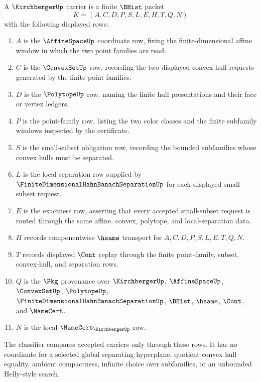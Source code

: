 \begin{definition}
\label{def:kirchberger-finite-separation-carrier}
A $\KirchbergerUp$ carrier is a finite $\BHist$ packet
$$
K=(A,C,D,P,S,L,E,H,T,Q,N)
$$
with the following displayed rows:
\begin{enumerate}
\item $A$ is the $\AffineSpaceUp$ coordinate row, fixing the finite-dimensional affine window in which the two point families are read.
\item $C$ is the $\ConvexSetUp$ row, recording the two displayed convex hull requests generated by the finite point families.
\item $D$ is the $\PolytopeUp$ row, naming the finite hull presentations and their face or vertex ledgers.
\item $P$ is the point-family row, listing the two color classes and the finite subfamily windows inspected by the certificate.
\item $S$ is the small-subset obligation row, recording the bounded subfamilies whose convex hulls must be separated.
\item $L$ is the local separation row supplied by $\FiniteDimensionalHahnBanachSeparationUp$ for each displayed small-subset request.
\item $E$ is the exactness row, asserting that every accepted small-subset request is routed through the same affine, convex, polytope, and local-separation data.
\item $H$ records componentwise $\hsame$ transport for $A,C,D,P,S,L,E,T,Q,N$.
\item $T$ records displayed $\Cont$ replay through the finite point-family, subset, convex-hull, and separation rows.
\item $Q$ is the $\Pkg$ provenance over $\KirchbergerUp$, $\AffineSpaceUp$, $\ConvexSetUp$, $\PolytopeUp$, $\FiniteDimensionalHahnBanachSeparationUp$, $\BHist$, $\hsame$, $\Cont$, and $\NameCert$.
\item $N$ is the local $\NameCert_{\KirchbergerUp}$ row.
\end{enumerate}
The classifier compares accepted carriers only through these rows. It has no coordinate for a selected global separating hyperplane, quotient convex hull equality, ambient compactness, infinite choice over subfamilies, or an unbounded Helly-style search.
\end{definition}

